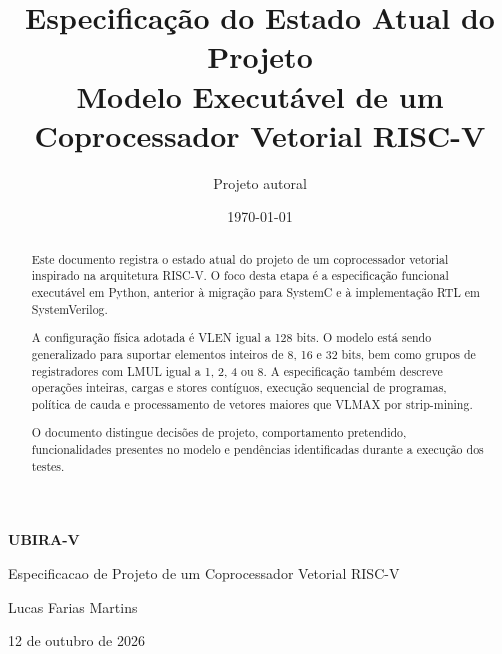 \documentclass[11pt,a4paper]{article}
\title{
    \textbf{Especificação do Estado Atual do Projeto}\\
    \large Modelo Executável de um Coprocessador Vetorial RISC-V
}
\author{Projeto autoral}
\date{\today}
\begin{document}

\begin{titlepage}
    \centering

    \vspace*{0.22\textheight}

    {\Huge\bfseries UBIRA-V\par}
    \vspace{0.5cm}
    {\LARGE Especificacao de Projeto de um Coprocessador Vetorial RISC-V\par}

    \vspace{1.5cm}

    {\Large Lucas Farias Martins\par}

    \vfill

    {\large 12 de outubro de 2026\par}
\end{titlepage}

\clearpage


\begin{abstract}
    Este documento registra o estado atual do projeto de um coprocessador
    vetorial inspirado na arquitetura RISC-V. O foco desta etapa é a
    especificação funcional executável em Python, anterior à migração para
    SystemC e à implementação RTL em SystemVerilog.
    
    A configuração física adotada é VLEN igual a 128 bits. O modelo está
    sendo generalizado para suportar elementos inteiros de 8, 16 e 32 bits,
    bem como grupos de registradores com LMUL igual a 1, 2, 4 ou 8. A
    especificação também descreve operações inteiras, cargas e stores
    contíguos, execução sequencial de programas, política de cauda e
    processamento de vetores maiores que VLMAX por strip-mining.
    
    O documento distingue decisões de projeto, comportamento pretendido,
    funcionalidades presentes no modelo e pendências identificadas durante
    a execução dos testes.
\end{abstract}
    
\end{document}
